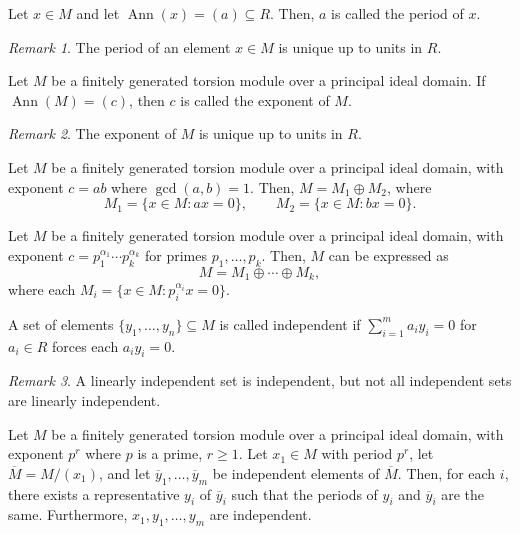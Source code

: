 \documentclass[11pt]{article}
\DeclareMathOperator{\Ann}{Ann}
\theoremstyle{definition}
\theoremstyle{remark}
\newtheorem*{remark}{Remark}
\numberwithin{equation}{section}
\begin{document}
    \begin{definition}
        Let $x \in M$ and let $\Ann(x) = (a) \subseteq R$. Then, $a$ is called the
        period of $x$.

        \begin{remark}
            The period of an element $x \in M$ is unique up to units in $R$.
        \end{remark}
    \end{definition}

    \begin{definition}
        Let $M$ be a finitely generated torsion module over a principal ideal domain.
        If $\Ann(M) = (c)$, then $c$ is called the exponent of $M$.

        \begin{remark}
            The exponent of $M$ is unique up to units in $R$.
        \end{remark}
    \end{definition}

    \begin{lemma}
        Let $M$ be a finitely generated torsion module over a principal ideal domain,
        with exponent $c = ab$ where $\gcd(a, b) = 1$. Then, $M = M_1 \oplus M_2$,
        where \[
            M_1 = \{x \in M: ax = 0\}, \qquad M_2 = \{x \in M: bx = 0\}.
        \]
    \end{lemma}

    \begin{corollary}
        Let $M$ be a finitely generated torsion module over a principal ideal domain,
        with exponent $c = p_1^{\alpha_1}\cdots p_k^{\alpha_k}$ for primes $p_1,
        \dots, p_k$. Then, $M$ can be expressed as \[
            M = M_1\oplus \cdots \oplus M_k,
        \] where each $M_i = \{x \in M: p_i^{\alpha_i}x = 0\}$.
    \end{corollary}

    \begin{definition}
        A set of elements $\{y_1, \dots, y_n\} \subseteq M$ is called independent if
        $\sum_{i = 1}^m a_i y_i = 0$ for $a_i \in R$ forces each $a_iy_i = 0$.

        \begin{remark}
            A linearly independent set is independent, but not all independent sets
            are linearly independent.
        \end{remark}
    \end{definition}

    \begin{lemma}
        Let $M$ be a finitely generated torsion module over a principal ideal domain,
        with exponent $p^r$ where $p$ is a prime, $r\geq 1$. Let $x_1 \in M$ with
        period $p^r$, let $\overline{M} = M / (x_1)$, and let $\overline{y}_1, \dots,
        \overline{y}_m$ be independent elements of $\overline{M}$. Then, for each
        $i$, there exists a representative $y_i$ of $\overline{y}_i$ such that the
        periods of $y_i$ and $\overline{y}_i$ are the same. Furthermore, $x_1, y_1,
        \dots, y_m$ are independent.
    \end{lemma}
\end{document}
